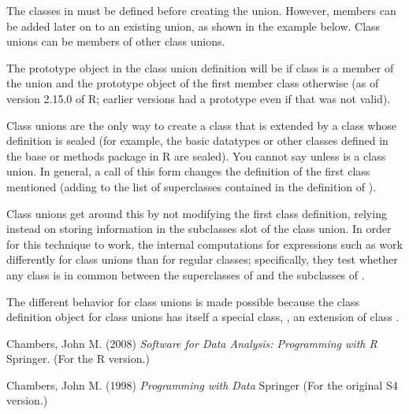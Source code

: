 \begin{Details}\relax
The classes in  must be defined before creating the
union.  However, members can be added later on to an existing
union, as shown in the example below. Class unions can be
members of other class unions.

The prototype object in the class union definition will be
 if class  is a member of the union and
the prototype object of the first member class otherwise (as of
version 2.15.0 of R; earlier versions had a  prototype even if
that was not valid).

Class unions are the only way to create a class that is extended by
a class whose definition is sealed (for example, the
basic datatypes or other classes defined in the base or methods
package in R are sealed).  You cannot say 
unless  is a class union.  In general, a
 call of this form changes the definition of the
first class mentioned (adding  to the list of
superclasses contained in the definition of ).

Class unions get around this by not modifying the first class
definition, relying instead on storing information in the subclasses
slot of the class union.  In order for this technique to work, the
internal computations for expressions such as
 work
differently for class unions than for regular classes; specifically,
they test whether any class is in common between the superclasses of
 and the subclasses of .

The different behavior for class unions is made possible because the
class definition object for class unions has itself a special class,
, an extension of class
.

\end{Details}
%
\begin{References}\relax
Chambers, John M. (2008)
\emph{Software for Data Analysis: Programming with R}
Springer.  (For the R version.)

Chambers, John M. (1998)
\emph{Programming with Data}
Springer (For the original S4 version.)
\end{References}
%

